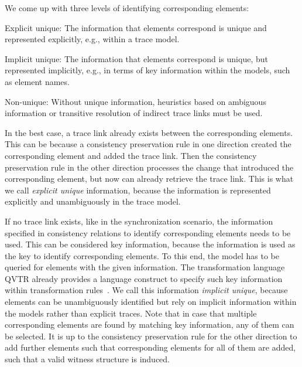 We come up with three levels of identifying corresponding elements:
\begin{properdescription}
    \item[Explicit unique:] The information that elements correspond is unique and represented explicitly, e.g., within a trace model. %
    \item[Implicit unique:] The information that elements correspond is unique, but represented implicitly, e.g., in terms of key information within the models, such as element names. %
    \item[Non-unique:] Without unique information, heuristics based on ambiguous information or transitive resolution of indirect trace links must be used.
\end{properdescription}

In the best case, a trace link already exists between the corresponding elements. This can be because a consistency preservation rule in one direction created the corresponding element and added the trace link. Then the consistency preservation rule in the other direction processes the change that introduced the corresponding element, but now can already retrieve the trace link.
This is what we call \emph{explicit unique} information, because the information is represented explicitly and unambiguously in the trace model.

If no trace link exists, like in the synchronization scenario, the information specified in consistency relations to identify corresponding elements needs to be used.
This can be considered key information, because the information is used as the key to identify corresponding elements.
To this end, the model has to be queried for elements with the given information.
The transformation language \gls{QVTR} already provides a language construct to specify such key information within transformation rules~\cite[7.10.2.]{qvt}.
We call this information \emph{implicit unique}, because elements can be unambiguously identified but rely on implicit information within the models rather than explicit traces.
Note that in case that multiple corresponding elements are found by matching key information, any of them can be selected.
It is up to the consistency preservation rule for the other direction to add further elements such that corresponding elements for all of them are added, such that a valid witness structure is induced.

